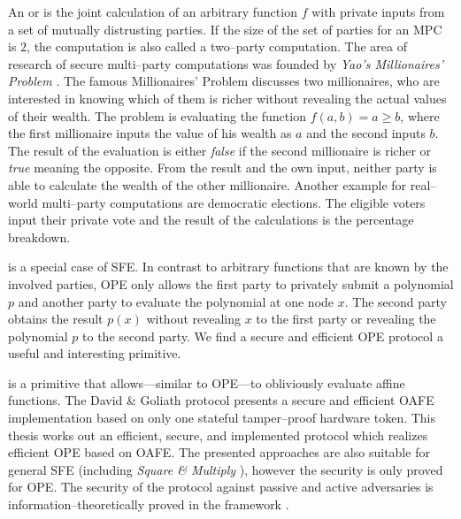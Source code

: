 \label{sec:introduction}

An  or  is the joint calculation of an arbitrary function $f$ with
private inputs from a set of mutually distrusting parties. If the size of the
set of parties for an MPC is $2$, the computation is also called a two--party
computation. The area of research of secure multi--party computations was
founded by \emph{Yao's Millionaires' Problem} \cite{yao82}. The famous
Millionaires' Problem discusses two millionaires, who are interested in knowing
which of them is richer without revealing the actual values of their wealth. The
problem is evaluating the function $f(a, b) = a \geq b$, where the first
millionaire inputs the value of his wealth as $a$ and the second inputs $b$. The
result of the evaluation is either \textit{false} if the second millionaire is
richer or \textit{true} meaning the opposite. From the result and the own input,
neither party is able to calculate the wealth of the other millionaire. Another
example for real--world multi--party computations are democratic elections. The
eligible voters input their private vote and the result of the calculations is
the percentage breakdown.

 \cite{naor99,naor06} is a special
case of SFE. In contrast to arbitrary functions that are known by the involved
parties, OPE only allows the first party to privately submit a polynomial $p$
and another party to evaluate the polynomial at one node $x$. The second party
obtains the result $p(x)$ without revealing $x$ to the first party or revealing
the polynomial $p$ to the second party. We find a secure and efficient OPE
protocol a useful and interesting primitive. 

 \cite{davidgoliath} is a
primitive that allows---similar to OPE---to obliviously evaluate affine
functions. The David \& Goliath protocol \cite{davidgoliath} presents a secure
and efficient OAFE implementation based on only one stateful tamper--proof
hardware token. This thesis works out an efficient, secure, and implemented
protocol which realizes efficient OPE based on OAFE. The presented approaches
are also suitable for general SFE (including \emph{Square \& Multiply}
\cite{knuth81}), however the security is only proved for OPE. The security of
the protocol against passive and active adversaries is
in\-for\-ma\-tion--the\-o\-ret\-ically proved in the  framework \cite{canetti05}. 


